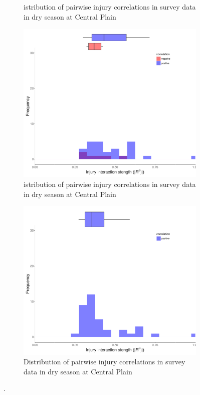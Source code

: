 \begin{figure}
\begin{subfigure}[b]{0.5\textwidth}
        \caption{istribution of pairwise injury correlations in survey data in dry season at Central Plain}
        \label{fig:cortest4}
    \end{subfigure}
\begin{subfigure}[b]{0.5\textwidth}
        \includegraphics[width = 1\textwidth]{figures/combinedplotRR_ds.pdf}
        \caption{istribution of pairwise injury correlations in survey data in dry season at Central Plain}
        \label{fig:cortest5}
    \end{subfigure}
\begin{subfigure}[b]{0.5\textwidth}
        \includegraphics[width = 1\textwidth]{figures/combinedplotRR_ws.pdf}
        \caption{Distribution of pairwise injury correlations in survey data in dry season at Central Plain}
        \label{fig:cortest6}
    \end{subfigure}
\caption{.}
    \label{fig:corfretest1}
\end{figure}


